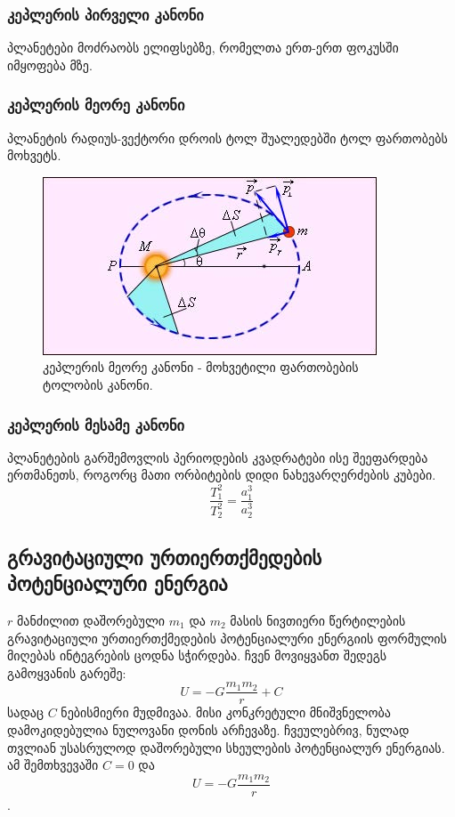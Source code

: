 \documentclass[a4paper]{book}
\begin{document}
\subsubsection{კეპლერის პირველი კანონი}
	პლანეტები მოძრაობს ელიფსებზე, რომელთა ერთ-ერთ ფოკუსში იმყოფება მზე.
\subsubsection{კეპლერის მეორე კანონი}
პლანეტის რადიუს-ვექტორი დროის ტოლ შუალედებში ტოლ ფართობებს მოხვეტს.
		\begin{figure}[H]
		   \centering
           \includegraphics[width=0.5\columnwidth]{figures/kepler_2_law}
           \caption{კეპლერის მეორე კანონი - მოხვეტილი ფართობების ტოლობის კანონი.}
           \label{fig:kepler_2_law}
        \end{figure}
	
\subsubsection{კეპლერის მესამე კანონი}
	პლანეტების გარშემოვლის პერიოდების კვადრატები ისე შეეფარდება ერთმანეთს, როგორც მათი ორბიტების დიდი ნახევარღერძების კუბები.
	\begin{equation}
		\frac{T_1^2}{T_2^2} = \frac{a_1^3}{a_2^3}
	\end{equation}
	
\subsection{გრავიტაციული ურთიერთქმედების პოტენციალური ენერგია}
	$r$ მანძილით დაშორებული $m_1$ და $m_2$ მასის ნივთიერი წერტილების გრავიტაციული ურთიერთქმედების პოტენციალური ენერგიის ფორმულის მიღებას ინტეგრების ცოდნა სჭირდება. ჩვენ მოვიყვანთ შედეგს გამოყვანის გარეშე:
	\begin{equation}
		U = -G\frac{m_1 m_2}{r} + C
	\end{equation}
სადაც $C$ ნებისმიერი მუდმივაა. მისი კონკრეტული მნიშვნელობა დამოკიდებულია ნულოვანი დონის არჩევაზე. ჩვეულებრივ, ნულად თვლიან
უსასრულოდ დაშორებული სხეულების პოტენციალურ ენერგიას. ამ შემთხვევაში	$C = 0$ და $$U = -G\frac{m_1 m_2}{r}$$.
	
\end{document}

